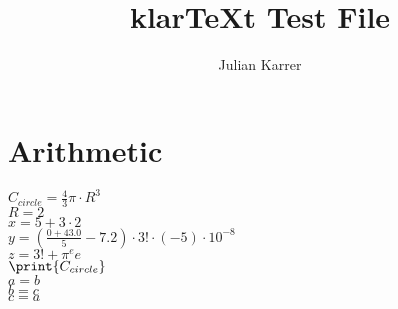 \documentclass[oneside, a4paper]{article}
\author{Julian Karrer}
\title{klarTeXt Test File}
\begin{document}
\maketitle
\section*{Arithmetic}


\begin{program}

$C_{circle} = \frac{4}{3}\pi \cdot R^3$\\
$R = 2$\\
$x = 5+3\cdot 2$\\
$y = \left(\frac{0+43.0}{5}-7.2\right)\cdot 3! \cdot (-5) \cdot 10^{-8}$\\
$z = 3! + \pi^e e$\\
$\print{C_{circle}}$\\
$a = b$\\
$b = c$\\
$c = a$\\


\end{program}
\end{document}
